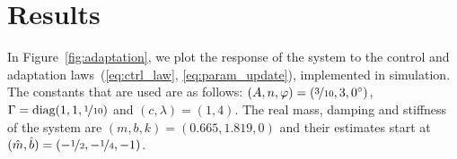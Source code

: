 \section{Results}
\label{sec:results}

In Figure~\ref{fig:adaptation}, we plot the response of the system to the
control and adaptation laws~(\ref{eq:ctrl_law}, \ref{eq:param_update}),
implemented in simulation. The constants that are used are as follows: $(A, n,
\varphi) = (\nicefrac{3}{10}, 3, 0^\circ)$, $\Gamma = \text{diag}{(1, 1,
\nicefrac{1}{10})}$ and $(c, \lambda) = (1, 4)$. The real mass, damping and
stiffness of the system are $(m, b, k) = (0.665, 1.819, 0)$ and their estimates
start at $(\hat{m}, \hat{b}) = (-\nicefrac{1}{2}, -\nicefrac{1}{4}, -1)$.
